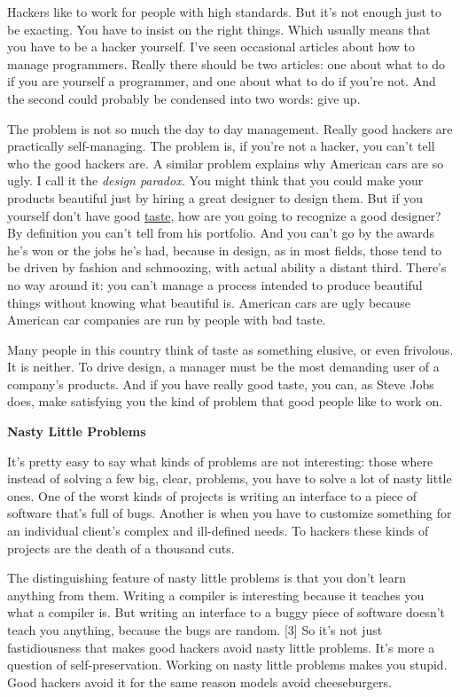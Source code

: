 Hackers like to work for people with high standards. But it's not enough
just to be exacting. You have to insist on the right things. Which
usually means that you have to be a hacker yourself. I've seen
occasional articles about how to manage programmers. Really there should
be two articles: one about what to do if you are yourself a programmer,
and one about what to do if you're not. And the second could probably be
condensed into two words: give up.

The problem is not so much the day to day management. Really good
hackers are practically self-managing. The problem is, if you're not a
hacker, you can't tell who the good hackers are. A similar problem
explains why American cars are so ugly. I call it the \emph{design
paradox.} You might think that you could make your products beautiful
just by hiring a great designer to design them. But if you yourself
don't have good \href{taste.html}{taste}, how are you going to recognize
a good designer? By definition you can't tell from his portfolio. And
you can't go by the awards he's won or the jobs he's had, because in
design, as in most fields, those tend to be driven by fashion and
schmoozing, with actual ability a distant third. There's no way around
it: you can't manage a process intended to produce beautiful things
without knowing what beautiful is. American cars are ugly because
American car companies are run by people with bad taste.

Many people in this country think of taste as something elusive, or even
frivolous. It is neither. To drive design, a manager must be the most
demanding user of a company's products. And if you have really good
taste, you can, as Steve Jobs does, make satisfying you the kind of
problem that good people like to work on.

\textbf{Nasty Little Problems}

It's pretty easy to say what kinds of problems are not interesting:
those where instead of solving a few big, clear, problems, you have to
solve a lot of nasty little ones. One of the worst kinds of projects is
writing an interface to a piece of software that's full of bugs. Another
is when you have to customize something for an individual client's
complex and ill-defined needs. To hackers these kinds of projects are
the death of a thousand cuts.

The distinguishing feature of nasty little problems is that you don't
learn anything from them. Writing a compiler is interesting because it
teaches you what a compiler is. But writing an interface to a buggy
piece of software doesn't teach you anything, because the bugs are
random. {[}3{]} So it's not just fastidiousness that makes good hackers
avoid nasty little problems. It's more a question of self-preservation.
Working on nasty little problems makes you stupid. Good hackers avoid it
for the same reason models avoid cheeseburgers.

